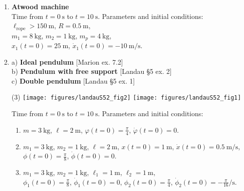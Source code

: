 \documentclass[11pt, a4paper, twoside]{article}
\begin{document}
\begin{enumerate}


\item 
\begin{minipage}[t][2.5cm]{0.7\textwidth}
\textbf{Atwood machine}\\
Time from \(t = \SI{0}{\second}\) to \(t = \SI{10}{\second}\).
Parameters and initial conditions:\\
\(\ell_\mathrm{rope} > \SI{150}{\metre}\), 
\(R = \SI{0.5}{\metre}\), \\ 
\(m_1 = \SI{8}{\kilo\gram}\), 
\(m_2 = \SI{1}{\kilo\gram}\), 
\(m_p = \SI{4}{\kilo\gram}\), \\
\(x_1(t=0) = \SI{25}{\metre}\), 
\(\dot{x}_1(t=0) = -\SI{10}{\metre\per\second}\).
\end{minipage}
\begin{minipage}[c][2cm][t]{0.3\textwidth}
	
\end{minipage}

\item
	a) \textbf{Ideal pendulum} [Marion ex. 7.2] \\
	b) \textbf{Pendulum with free support} [Landau \S5 ex. 2]\\ 
	c) \textbf{Double pendulum} [Landau \S5 ex. 1] 
\begin{tasks}(3)
	\task 
	\task \texttt{[image: figures/landauS52\_fig2]}
	\task \texttt{[image: figures/landauS52\_fig1]}
\end{tasks}
Time from \(t = \SI{0}{\second}\) to \(t = \SI{10}{\second}\). Parameters and initial conditions:
\begin{enumerate}
	\item \(m = \SI{3}{\kilo\gram}\), 
				\(\ell = \SI{2}{\metre}\), 
				\(\varphi (t=0) = \frac{\pi}{4}\), \(\dot{\varphi} (t=0) = 0\).
	\item \(m_1 = \SI{3}{\kilo\gram}\), \(m_2 = \SI{1}{\kilo\gram}\),   
				\(\ell = \SI{2}{\metre}\), 
				\(x(t=0) = \SI{1}{\metre}\), \(\dot{x} (t=0) = \SI{0.5}{\metre\per\second} \),
				\(\phi (t=0) = \frac{\pi}{8}\), \(\dot{\phi} (t=0) = 0\).
	\item \(m_1 = \SI{3}{\kilo\gram}\), \(m_2 = \SI{1}{\kilo\gram}\),
				\(\ell_1 = \SI{1}{\metre}\), \(\ell_2 = \SI{1}{\metre}\),\\ 
				\(\phi_1 (t=0) = \frac{\pi}{8}\), \(\dot{\phi}_1 (t=0) = 0\), 
				\(\phi_2 (t=0) = \frac{\pi}{4}\), \(\dot{\phi}_2 (t=0) = -\frac{\pi}{16} \si{\per\second}\).
\end{enumerate}



\end{enumerate}
\end{document}
